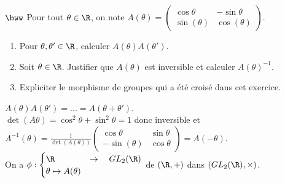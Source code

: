 \documentclass[11pt]{article}
\begin{document}
\begin{exercice}{$\bww$}{}
    Pour tout $\theta\in\R$, on note $A(\theta)=\begin{pmatrix}\cos\theta&-\sin\theta\\\sin(\theta)&\cos(\theta)\end{pmatrix}$.
    \begin{enumerate}
        \item Pour $\theta,\theta'\in\R$, calculer $A(\theta)A(\theta')$.
        \item Soit $\theta\in\R$. Justifier que $A(\theta)$ est inversible et calculer $A(\theta)^{-1}$.
        \item Expliciter le morphisme de groupes qui a été croisé dans cet exercice.
    \end{enumerate}
    \tcblower
     $A(\theta)A(\theta')=...=A(\theta+\theta')$.\\
     $\det(A\theta)=\cos^2\theta+\sin^2\theta=1$ donc inversible et $A^{-1}(\theta)=\frac{1}{\det(A(\theta))}\begin{pmatrix}\cos\theta&\sin\theta\\-\sin(\theta)&\cos\theta\end{pmatrix}=A(-\theta)$.\\
     On a $\phi:\begin{cases}\R&\to\quad GL_2(\R)\\\theta\mapsto A(\theta)\end{cases}$ de $(\R,+)$ dans $(GL_2(\R),\times)$.
\end{exercice}

\vspace*{-0.2cm}
\end{document}
